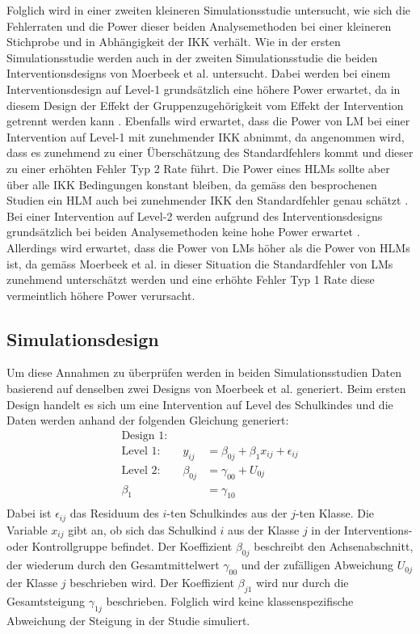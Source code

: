\documentclass[12pt, a4paper]{article}\usepackage[]{graphicx}\usepackage[]{color}
\begin{document}
Folglich wird in einer zweiten kleineren Simulationsstudie untersucht, wie sich die Fehlerraten und die Power dieser beiden Analysemethoden bei einer kleineren Stichprobe und in Abhängigkeit der IKK verhält. Wie in der ersten Simulationsstudie werden auch in der zweiten Simulationsstudie die beiden Interventionsdesigns von Moerbeek et al. \citeyearpar{MOERBEEK2003341} untersucht. Dabei werden bei einem Interventionsdesign auf Level-1 grundsätzlich eine höhere Power erwartet, da in diesem Design der Effekt der Gruppenzugehörigkeit vom Effekt der Intervention getrennt werden kann \citep{moerbeek2000design}. Ebenfalls wird erwartet, dass die Power von LM bei einer Intervention auf Level-1 mit zunehmender IKK abnimmt, da angenommen wird, dass es zunehmend zu einer Überschätzung des Standardfehlers kommt und dieser zu einer erhöhten Fehler Typ 2 Rate führt. Die Power eines HLMs sollte aber über alle IKK Bedingungen konstant bleiben, da gemäss den besprochenen Studien ein HLM auch bei zunehmender IKK den Standardfehler genau schätzt \citep{mcneish2014analyzing}. Bei einer Intervention auf Level-2 werden aufgrund des Interventionsdesigns grundsätzlich bei beiden Analysemethoden keine hohe Power erwartet \citep{moerbeek2000design}. Allerdings wird erwartet, dass die Power von LMs höher als die Power von HLMs ist, da gemäss Moerbeek et al. \citeyearpar{MOERBEEK2003341} in dieser Situation die Standardfehler von LMs zunehmend unterschätzt werden und eine erhöhte Fehler Typ 1 Rate diese vermeintlich höhere Power verursacht.

\subsection{Simulationsdesign} \label{section:sim_design}
Um diese Annahmen zu überprüfen werden in beiden Simulationsstudien Daten basierend auf denselben zwei Designs von Moerbeek et al. \citeyearpar{MOERBEEK2003341} generiert. Beim ersten Design handelt es sich um eine Intervention auf Level des Schulkindes und die Daten werden anhand der folgenden Gleichung generiert:
\begin{equation} 
\begin{split}
\text{Design 1:}\\	
 \text{Level 1:}  \qquad y_{ij} & = \beta_{0j} + \beta_{1}x_{ij} + \epsilon_{ij}\\
 \text{Level 2:} \qquad \beta_{0j} & = \gamma_{00} + U_{0j}\\
 \beta_{1} & = \gamma_{10}\\
 \end{split}	
\end{equation} 
Dabei ist $\epsilon_{ij}$ das Residuum des $i$-ten Schulkindes aus der $j$-ten Klasse. Die Variable $x_{ij}$ gibt an, ob sich das Schulkind $i$ aus der Klasse $j$ in der Interventions- oder Kontrollgruppe befindet. Der Koeffizient $\beta_{0j}$ beschreibt den Achsenabschnitt, der wiederum durch den Gesamtmittelwert $\gamma_{00}$ und der zufälligen Abweichung $U_{0j}$ der Klasse $j$ beschrieben wird. Der Koeffizient $\beta_{j1}$ wird nur durch die Gesamtsteigung $\gamma_{1j}$ beschrieben. Folglich wird keine klassenspezifische Abweichung der Steigung in der Studie simuliert.
\end{document}
